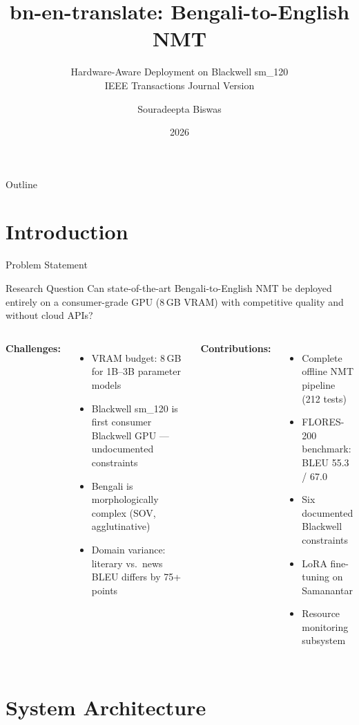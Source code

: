 \documentclass[aspectratio=169,10pt]{beamer}
\title{bn-en-translate: Bengali-to-English NMT}
\subtitle{Hardware-Aware Deployment on Blackwell sm\_120\\
\normalsize IEEE Transactions Journal Version}
\author{Souradeepta Biswas}
\institute{M.S. Computer Science, Syracuse University \\ Independent Researcher}
\date{2026}
\begin{document}
\begin{frame}
  \titlepage
\end{frame}

\begin{frame}{Outline}
  \tableofcontents
\end{frame}

\section{Introduction}

\begin{frame}{Problem Statement}
  \begin{block}{Research Question}
    Can state-of-the-art Bengali-to-English NMT be deployed entirely on a
    consumer-grade GPU (8\,GB VRAM) with competitive quality and without cloud APIs?
  \end{block}
  \vspace{0.3cm}
  \begin{columns}
    \textbf{Challenges:}
    \begin{itemize}
      \item VRAM budget: 8\,GB for 1B--3B parameter models
      \item Blackwell sm\_120 is first consumer Blackwell GPU --- undocumented constraints
      \item Bengali is morphologically complex (SOV, agglutinative)
      \item Domain variance: literary vs.\ news BLEU differs by 75+ points
    \end{itemize}
    \textbf{Contributions:}
    \begin{itemize}
      \item Complete offline NMT pipeline (212 tests)
      \item FLORES-200 benchmark: BLEU 55.3 / 67.0
      \item Six documented Blackwell constraints
      \item LoRA fine-tuning on Samanantar
      \item Resource monitoring subsystem
    \end{itemize}
  \end{columns}
\end{frame}

\section{System Architecture}
\end{document}
